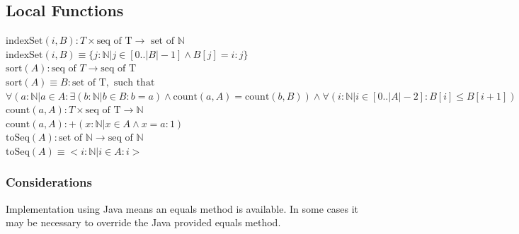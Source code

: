\documentclass[12pt,fleqn]{examtst}
\begin{document}
\subsection*{Local Functions}

\noindent $\mbox{indexSet}(i, B): T \times \mbox{seq of T}  \rightarrow \mbox{ set of }
\mathbb{N}$\\
\noindent $\mbox{indexSet}(i, B) \equiv \{j: \mathbb{N} | j \in [0..|B|-1]
\wedge B[j] = i : j \}$\\

\noindent $\mbox{sort}(A): \mbox{seq of } T \rightarrow \mbox{seq of T}$\\
\noindent $\mbox{sort}(A) \equiv B: \mbox{set of T}, \mbox{ such that }$\\
\noindent
$\forall (a: \mathbb{N} | a \in A : \exists(b: \mathbb{N} | b \in B: b = a)
\wedge \mbox{count}(a, A) = \mbox{count}(b, B)) \wedge \forall (i: \mathbb{N} |
i \in [0..|A|-2] : B[i] \leq B[i+1])$\\

\noindent $\mbox{count}(a, A): T \times \mbox{seq of T} \rightarrow \mathbb{N}$\\
\noindent $\mbox{count}(a, A): + (x: \mathbb{N} | x \in A \wedge x = a : 1)$\\

\noindent $\mbox{toSeq}(A): \mbox{set of } \mathbb{N} \rightarrow \mbox{seq of }
\mathbb{N}$\\
\noindent $\mbox{toSeq}(A) \equiv < i: \mathbb{N} | i \in A : i > $

\subsubsection* {Considerations}

Implementation using Java means an equals method is available.  In some cases it
may be necessary to override the Java provided equals method.


\newpage
\end{document}
